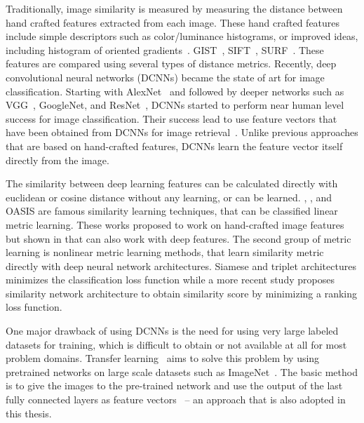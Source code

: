 Traditionally, image similarity is measured by measuring the distance between hand crafted features extracted from each image. These hand crafted features include simple descriptors such as color/luminance histograms, or improved ideas, including histogram of oriented gradients~\cite{dalal2005histograms}. GIST~\cite{oliva2001modeling}, SIFT~\cite{lowe2004distinctive}, SURF~\cite{bay2006surf}. These features are compared using several types of distance metrics. Recently, deep convolutional neural networks (DCNNs) became the state of art for image classification. Starting with AlexNet~\cite{krizhevsky2012imagenet} and followed by deeper networks such as VGG~\cite{simonyan2014very}, GoogleNet\cite{szegedy2015going}, and ResNet~\cite{he2016deep}, DCNNs started to perform near human level success for image classification. Their success lead to use feature vectors that have been obtained from DCNNs for image retrieval~\cite{wan2014deep,gordo2016deep,noh2017large,radenovic2018fine}. Unlike previous approaches that are based on hand-crafted features, DCNNs learn the feature vector itself directly from the image. 

The similarity between deep learning features can be calculated directly with euclidean or cosine distance without any learning, or can be learned. \cite{frome2007image}, \cite{mcfee2010metric}, \cite{liang2016optimizing} and  OASIS\cite{chechik2010large} are famous similarity learning techniques, that can be classified linear metric learning. These works proposed to work on hand-crafted image features but shown in \cite{wan2014deep} that can also work with deep features. The second group of metric learning is nonlinear metric learning methods, that learn similarity metric directly with deep neural network architectures\cite{pinheiro2018unsupervised}. Siamese\cite{chopra2005learning}\cite{bell2015learning} and triplet\cite{wang2014learning} \cite{arandjelovic2016netvlad} architectures minimizes the classification loss function while a more recent study \cite{garcia2019learning} proposes similarity network architecture to obtain similarity score by minimizing a ranking loss function.

One major drawback of using DCNNs is the need for using very large labeled datasets for training, which is difficult to obtain or not available at all for most problem domains. Transfer learning~\cite{yosinski2014transferable} aims to solve this problem by using pretrained networks on large scale datasets such as ImageNet~\cite{russakovsky2015imagenet}. The basic method is to give the images to the pre-trained network and use the output of the last fully connected layers as feature vectors~\cite{donahue2014decaf,wan2014deep} -- an approach that is also adopted in this thesis.

